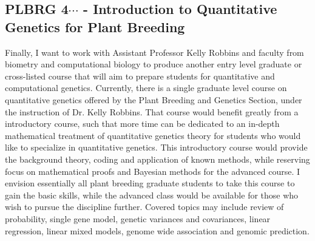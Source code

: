 \documentclass[10pt]{article}
\begin{document}






\subsection*{PLBRG 4$\cdots$ - Introduction to Quantitative Genetics for Plant Breeding }

Finally, I want to work with Assistant Professor Kelly Robbins and faculty from biometry and computational biology to produce another entry level graduate or cross-listed course that will aim to prepare students for quantitative and computational genetics. Currently, there is a single graduate level course on quantitative genetics offered by the Plant Breeding and Genetics Section, under the instruction of Dr. Kelly Robbins. That course would benefit greatly from a introductory course, such that more time can be dedicated to an in-depth mathematical treatment of quantitative genetics theory for students who would like to specialize in quantitative genetics. This introductory course would provide the background theory, coding and application of known methods, while reserving focus on mathematical proofs and Bayesian methods for the advanced course. I envision essentially all plant breeding graduate students to take this course to gain the basic skills, while the advanced class would be available for those who wish to pursue the discipline further. Covered topics may include review of probability, single gene model, genetic variances and covariances, linear regression, linear mixed models, genome wide association and genomic prediction.
\end{document}
